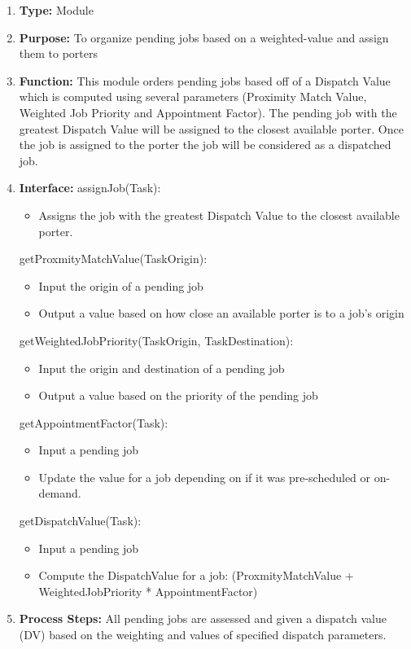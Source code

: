 \documentclass[paper=letter, fontsize=10pt]{scrartcl}
\numberwithin{equation}{section}		%
\numberwithin{figure}{section}			%
\numberwithin{table}{section}				%
\begin{document}
\begin{enumerate}[]
	\item \textbf{Type:} Module
	\item \textbf{Purpose:} To organize pending jobs based on a weighted-value and assign them to porters 
	\item \textbf{Function:} This module orders pending jobs based off of a Dispatch Value which is computed using several parameters (Proximity Match Value, Weighted Job Priority and Appointment Factor).  The pending job with the greatest Dispatch Value will be assigned to the closest available porter.  Once the job is assigned to the porter the job will be considered as a dispatched job.
	\item \textbf{Interface:} \newline
	 assignJob(Task):
	 	\begin{itemize}
	 		\item Assigns the job with the greatest Dispatch Value to the closest available porter.
	 	\end{itemize}
	 getProxmityMatchValue(TaskOrigin):
	 	\begin{itemize}
	 		\item Input the origin of a pending job
	 		\item Output a value based on how close an available porter is to a job's origin
	 	\end{itemize}
	 getWeightedJobPriority(TaskOrigin, TaskDestination):
	 	\begin{itemize}
	 		\item Input the origin and destination of a pending job
	 		\item Output a value based on the priority of the pending job
	 	\end{itemize}
	 getAppointmentFactor(Task):
	 	\begin{itemize}
	 		\item Input a pending job
	 		\item Update the value for a job depending on if it was pre-scheduled or on-demand.
	 	\end{itemize}
	 getDispatchValue(Task):
	 	\begin{itemize}
	 		\item Input a pending job
	 		\item Compute the DispatchValue for a job: (ProxmityMatchValue + WeightedJobPriority * AppointmentFactor) 
	 	\end{itemize}
	\item \textbf{Process Steps:}
	All pending jobs are assessed and given a dispatch value (DV) based on the weighting and values of specified dispatch parameters.
	

\end{enumerate}
\end{document}
